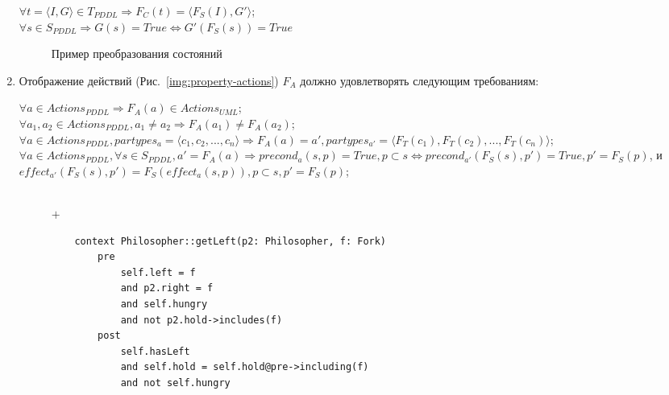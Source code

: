 \documentclass[a4paper,14pt]{extreport}
\begin{document}
\begin{enumerate}
        \begin{center}
            $\forall t = \langle I, G \rangle \in T_{PDDL} \Rightarrow F_C(t) = \langle F_S(I), G' \rangle$; \\
            $\forall s \in S_{PDDL} \Rightarrow G(s) = True \Leftrightarrow G'(F_S(s)) = True $
        \end{center}
   
\begin{figure}[h]
    \caption{Пример преобразования состояний}
    \label{img:property-tasks}
\end{figure}   
           
        \item
    Отображение действий (Рис.~\ref{img:property-actions}) $F_A$ должно удовлетворять следующим требованиям:
    \begin{center}
        $\forall a \in Actions_{PDDL} \Rightarrow F_A(a) \in Actions_{UML}$; \\    
    
        $\forall a_1, a_2 \in Actions_{PDDL}, a_1 \neq a_2 \Rightarrow F_A(a_1) \neq F_A(a_2)$; \\        
 
        $\forall a \in Actions_{PDDL}, partypes_a = \langle c_1, c_2, ..., c_n \rangle \Rightarrow F_A(a) = a', partypes_{a'} = \langle F_T(c_1), F_T(c_2), ..., F_T(c_n)\rangle$; \\
 
        $\forall a \in Actions_{PDDL}, \forall s \in S_{PDDL}, a' = F_A(a) \Rightarrow precond_a(s, p) = True, p \subset s \Leftrightarrow precond_{a'}(F_S(s), p') = True, p' = F_S(p)$, и \\
        
        $effect_{a'}(F_S(s), p') = F_S(effect_a(s, p)), p \subset s, p' = F_S(p) $;
    \end{center}            
       
\begin{figure}[h]
    \begin{minipage}[h]{1\linewidth}
    \end{minipage} \\
    \vfill
    {\centering $+$ \\ \medskip } 
        \begin{minipage}[h]{0.43\linewidth}
        
           \begin{verbatim}
    context Philosopher::getLeft(p2: Philosopher, f: Fork)
        pre 
            self.left = f 
            and p2.right = f 
            and self.hungry 
            and not p2.hold->includes(f)
        post
            self.hasLeft
            and self.hold = self.hold@pre->including(f)
            and not self.hungry
           \end{verbatim}
        \end{minipage}


\end{figure}
\end{enumerate}
\end{document}
